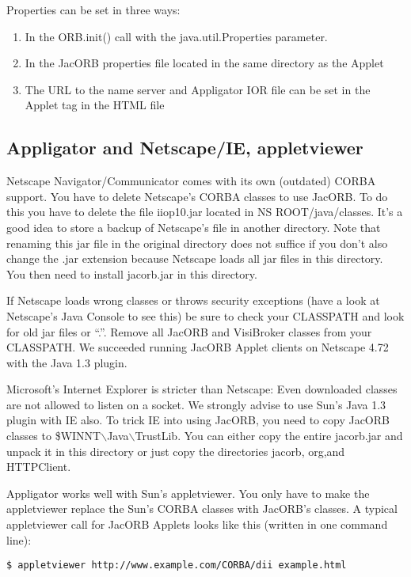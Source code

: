 Properties can be set in three ways:
\begin{enumerate}
\item In the ORB.init() call with the java.util.Properties parameter.
\item In the JacORB properties file located in the same directory as
  the Applet
\item The URL to the name server and Appligator IOR file can be set in
  the Applet tag in the HTML file
\end{enumerate}


\subsection{Appligator and Netscape/IE, appletviewer}

Netscape Navigator/Communicator comes with its own (outdated) CORBA
support. You have to delete Netscape's CORBA classes to use JacORB. To
do this you have to delete the file iiop10.jar located in NS
ROOT/java/classes. It's a good idea to store a backup of Netscape's
file in another directory. Note that renaming this jar file in the
original directory does not suffice if you don't also change the .jar
extension because Netscape loads all jar files in this directory. You
then need to install jacorb.jar in this directory.

If Netscape loads wrong classes or throws security exceptions (have a
look at Netscape's Java Console to see this) be sure to check your
CLASSPATH and look for old jar files or ``.''. Remove all JacORB and
VisiBroker classes from your CLASSPATH. We succeeded running JacORB
Applet clients on Netscape  4.72 with the Java 1.3 plugin.

Microsoft's Internet Explorer is stricter than Netscape: Even
downloaded classes are not allowed to listen on a socket. We strongly
advise to use Sun's Java 1.3 plugin with IE also. To trick IE into
using JacORB, you need to copy JacORB classes to
\$WINNT$\backslash$Java$\backslash$TrustLib. You can either copy the
entire jacorb.jar and unpack it in this directory or just copy the
directories jacorb, org,and HTTPClient.

Appligator works well with Sun's appletviewer. You only have to make
the appletviewer replace the Sun's CORBA classes with JacORB's
classes. A typical appletviewer call for JacORB Applets looks like
this (written in one command line):

\verb+$ appletviewer http://www.example.com/CORBA/dii example.html+

